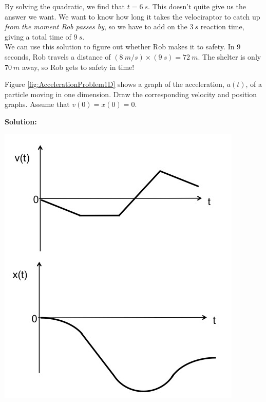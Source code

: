 By solving the quadratic, we find that $t=\SI{6}{s}$. This doesn't quite give us the answer we want. We want to know how long it takes the velociraptor to catch up \textit{from the moment Rob passes by}, so we have to add on the $\SI{3}{s}$ reaction time, giving a total time of $\SI{9}{s}$.\\

We can use this solution to figure out whether Rob makes it to safety. In 9 seconds, Rob travels a distance of $(\SI{8}{m/s})\times (\SI{9}{s}) = \SI{72}{m}$. The shelter is only $\SI{70}{m}$ away, so Rob gets to safety in time!


\begin{problem} Figure \ref{fig:AccelerationProblem1D} shows a graph of the acceleration, $a(t)$, of a particle moving in one dimension. Draw the corresponding velocity and position graphs. Assume that $v(0)=x(0)=0$. 
\end{problem}
\textbf{Solution:}
\begin{center}
\includegraphics[scale=0.6]{figures/DescribingMotionIn1D/VelocityPositionProblem.jpg}{\label{fig:VelocityPositionProblem1D}}
\end{center}
